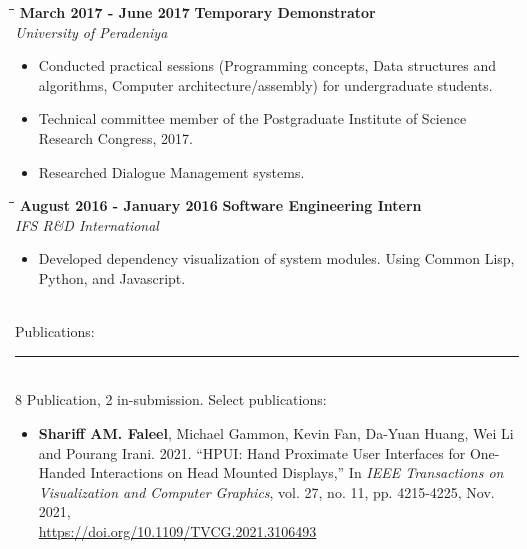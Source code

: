 \documentclass[a4paper,10pt]{article}
\begin{document}
{\begin{minipage}[t]{0.60\textwidth}
\begin{itemize}
\begin{itemize}
      \end{itemize}
    \end{itemize}
    \begin{tabbing}
      \=\hspace*{6cm}\=\hspace*{5cm}\= \kill
      \>\textbf{ March 2017 - June 2017} \> \textbf{Temporary Demonstrator}\\\>\> \emph{University of Peradeniya}
    \end{tabbing}
    \vspace{-0.5cm}
    \begin{itemize}
      \setlength\itemsep{-0.1pt}
    \item Conducted practical sessions (Programming concepts, Data structures and algorithms, Computer architecture/assembly) for undergraduate students. %
    \item Technical committee member of the Postgraduate Institute of Science Research Congress, 2017.
    \item Researched Dialogue Management systems.
    \end{itemize}
    \begin{tabbing}
      \=\hspace*{6cm}\=\hspace*{5cm}\= \kill
      \>\textbf{ August 2016 - January 2016} \> \textbf{Software Engineering Intern}\\\>\> \emph{IFS R\&D International}
    \end{tabbing}
    \vspace{-0.5cm}
    \begin{itemize}
      \setlength\itemsep{-0.1pt}
    \item Developed dependency visualization of system modules. Using Common Lisp, Python, and Javascript.
    \end{itemize}
    \vspace{0.5cm}\\
    {\large Publications:}\vspace{-0.2cm}\\
    \rule{0.75\textwidth}{0.4pt}
    \vspace{0.1cm}\\
    8 Publication, 2 in-submission. Select publications:
    \begin{itemize}
  \item[]\textbf{Shariff AM. Faleel}, Michael Gammon, Kevin Fan, Da-Yuan Huang, Wei Li and Pourang Irani. 2021. ``HPUI: Hand Proximate User Interfaces for One-Handed Interactions on Head Mounted Displays,'' In \textit{IEEE Transactions on Visualization and Computer Graphics}, vol. 27, no. 11, pp. 4215-4225, Nov. 2021,  \\\url{https://doi.org/10.1109/TVCG.2021.3106493}

\end{itemize}
\end{minipage}}
\end{document}
